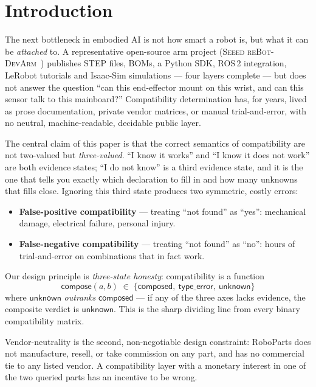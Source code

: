 \section{Introduction}

The next bottleneck in embodied AI is not how smart a robot is, but
what it can be \emph{attached} to. A representative open-source arm
project (\textsc{Seeed reBot-DevArm}~\cite{R14}) publishes STEP files,
BOMs, a Python SDK, ROS\,2 integration, LeRobot tutorials and Isaac-Sim
simulations — four layers complete — but does not answer the question
``can this end-effector mount on this wrist, and can this sensor talk
to this mainboard?'' Compatibility determination has, for years,
lived as prose documentation, private vendor matrices, or manual
trial-and-error, with no neutral, machine-readable, decidable public
layer.

The central claim of this paper is that the correct semantics of
compatibility are not two-valued but \emph{three-valued}. ``I know
it works'' and ``I know it does not work'' are both evidence states;
``I do not know'' is a third evidence state, and it is the one that
tells you exactly which declaration to fill in and how many unknowns
that fills close. Ignoring this third state produces two symmetric,
costly errors:

\begin{itemize}[nosep,leftmargin=*]
\item \textbf{False-positive compatibility} — treating ``not found''
as ``yes'': mechanical damage, electrical failure, personal injury.
\item \textbf{False-negative compatibility} — treating ``not found''
as ``no'': hours of trial-and-error on combinations that in fact
work.
\end{itemize}

Our design principle is \emph{three-state honesty}: compatibility
is a function
\begin{equation}
  \mathsf{compose}(a, b) \;\in\;
  \{\mathsf{composed},\ \mathsf{type\_error},\ \mathsf{unknown}\}
  \label{eq:trivalue}
\end{equation}
where $\mathsf{unknown}$ \emph{outranks} $\mathsf{composed}$ — if
any of the three axes lacks evidence, the composite verdict is
$\mathsf{unknown}$. This is the sharp dividing line from every binary
compatibility matrix.

Vendor-neutrality is the second, non-negotiable design constraint:
RoboParts does not manufacture, resell, or take commission on any
part, and has no commercial tie to any listed vendor. A compatibility
layer with a monetary interest in one of the two queried parts has
an incentive to be wrong.

